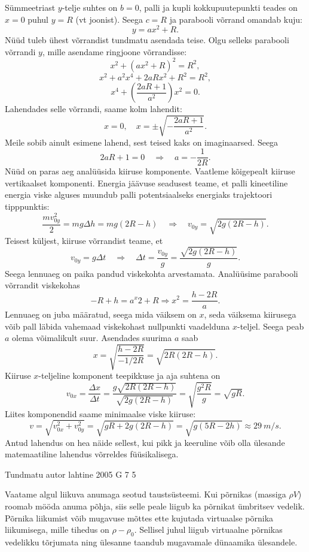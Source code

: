 \documentclass[11pt]{article}
\begin{document}
{{Sümmeetriast $y$-telje suhtes on $b = 0$, palli ja kupli kokkupuutepunkti teades on $x = 0$ puhul $y = R$ (vt joonist). Seega $c = R$ ja parabooli võrrand omandab kuju:
\[
y = ax^2 + R.
\]
Nüüd tuleb ühest võrrandist tundmatu asendada teise. Olgu selleks parabooli võrrandi $y$, mille asendame ringjoone võrrandisse:
\[
x^{2}+\left(a x^{2}+R\right)^{2}=R^{2},
\]
\[
x^{2}+a^{2} x^{4}+2 a R x^{2}+R^{2}=R^{2},
\]
\[
x^{4}+\left(\frac{2 a R+1}{a^{2}}\right) x^{2}=0.
\]
Lahendades selle võrrandi, saame kolm lahendit:
\[
x=0, \quad x=\pm \sqrt{-\frac{2 a R+1}{a^{2}}}.
\]
Meile sobib ainult esimene lahend, sest teised kaks on imaginaarsed. Seega
\[
2aR + 1 = 0 \quad\Rightarrow\quad a = - \frac{1}{2R}.
\]
Nüüd on paras aeg analüüsida kiiruse komponente. Vaatleme kõigepealt kiiruse vertikaalset komponenti. Energia jäävuse seadusest teame, et palli kineetiline energia viske alguses muundub palli potentsiaalseks energiaks trajektoori tipppunktis:
\[
\frac{m v_{0 y}^{2}}{2}=m g \Delta h=m g(2 R-h) \quad\Rightarrow\quad v_{0 y}=\sqrt{2 g(2 R-h)}.
\]
Teisest küljest, kiiruse võrrandist teame, et
\[
v_{0 y}=g \Delta t \quad \Rightarrow \quad \Delta t=\frac{v_{0 y}}{g}=\frac{\sqrt{2 g(2 R-h)}}{g}.
\]
Seega lennuaeg on paika pandud viskekohta arvestamata. Analüüsime parabooli võrrandit viskekohas
\[
-R + h = a^x2 + R \Rightarrow x^2 = \frac{h-2R}{a}.
\]
Lennuaeg on juba määratud, seega mida väiksem on $x$, seda väiksema kiirusega võib pall läbida vahemaad viskekohast nullpunkti vaadelduna $x$-teljel. Seega peab $a$ olema võimalikult suur. Asendades suurima $a$ saab
\[
x=\sqrt{\frac{h-2 R}{-1 / 2 R}}=\sqrt{2 R(2 R-h)}.
\]
Kiiruse $x$-teljeline komponent teepikkuse ja aja suhtena on
\[
v_{0 x}=\frac{\Delta x}{\Delta t}=\frac{g \sqrt{2 R(2 R-h)}}{\sqrt{2 g(2 R-h)}}=\sqrt{\frac{g^{2} R}{g}}=\sqrt{g R}.
\]
Liites komponendid saame minimaalse viske kiiruse:
\[
v=\sqrt{v_{0 x}^{2}+v_{0 y}^{2}}=\sqrt{g R+2 g(2 R-h)}=\sqrt{g(5 R-2 h)} \approx \SI{29}{m/s}.
\]
Antud lahendus on hea näide sellest, kui pikk ja keeruline võib olla ülesande matemaatiline lahendus võrreldes füüsikalisega.
\fi
}

{Tundmatu autor} %
{lahtine} %
{2005} %
{G 7} %
{5} %
{

\ifSolution
Vaatame algul liikuva anumaga seotud taustsüsteemi. Kui põrnikas (massiga $\rho V$) roomab mööda anuma põhja, siis selle peale liigub ka põrnikat ümbritsev vedelik. Põrnika liikumist võib mugavuse mõttes ette kujutada virtuaalse põrnika liikumisega, mille tihedus on $\rho - \rho_0$. Sellisel juhul liigub virtuaalne põrnikas vedelikku tõrjumata ning ülesanne taandub mugavamale dünaamika ülesandele.

}}
\end{document}
